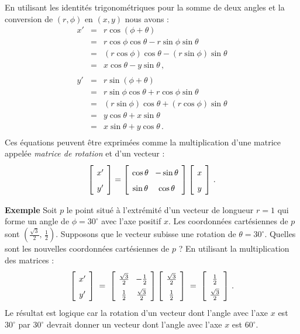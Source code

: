 En utilisant les identités trigonométriques pour la somme de deux angles et la conversion de $(r,\phi)$ en $(x,y)$ nous avons :
\begin{eqnarray*}
x' &=& r\cos(\phi+\theta)\\
&=&r\cos\phi\cos\theta - r\sin\phi\sin\theta\\
&=&(r\cos\phi)\cos\theta - (r\sin\phi)\sin\theta\\
&=&x\cos\theta - y\sin\theta\,,\\
\\
y' &=& r\sin(\phi+\theta)\\
&=&r\sin\phi\cos\theta + r\cos\phi\sin\theta\\
&=&(r\sin\phi)\cos\theta + (r\cos\phi)\sin\theta\\
&=&y\cos\theta + x\sin\theta\\
&=&x\sin\theta + y\cos\theta\,.\\
\end{eqnarray*}
Ces équations peuvent être exprimées comme la multiplication d'une matrice appelée \emph{matrice de rotation} et d'un vecteur :
\[
\spacearray
\left[\begin{array}{c}x'\\y'\end{array}\right]=
\left[\begin{array}{cc}\cos\theta&-\sin\theta\\\sin\theta&\cos\theta\end{array}\right]
\left[\begin{array}{c}x\\y\end{array}\right]\,.
\]

\medskip

\noindent\textbf{Exemple} Soit $p$ le point situé à l'extrémité d'un vecteur de longueur $r=1$ qui forme un angle de $\phi=30^{\circ}$ avec l'axe positif $x$. Les coordonnées cartésiennes de $p$ sont $\left(\frac{\sqrt{3}}{2},\,\frac{1}{2}\right)$. Supposons que le vecteur subisse une rotation de $\theta=30^{\circ}$. Quelles sont les nouvelles coordonnées cartésiennes de $p$ ? En utilisant la multiplication des matrices :
\[
\spacearray
\left[\begin{array}{c}x'\\y'\end{array}\right]\;=\;
\left[\begin{array}{cc}\frac{\sqrt{3}}{2}&-\frac{1}{2}\\\frac{1}{2}&\frac{\sqrt{3}}{2}\end{array}\right]
\left[\begin{array}{c}\frac{\sqrt{3}}{2}\\\frac{1}{2}\end{array}\right]\;=\;
\left[\begin{array}{c}\frac{1}{2}\\\frac{\sqrt{3}}{2}\end{array}\right]\,.
\]
Le résultat est logique car la rotation d'un vecteur dont l'angle avec l'axe $x$ est $30^{\circ}$ par $30^{\circ}$ devrait donner un vecteur dont l'angle avec l'axe $x$ est $60^{\circ}$.

